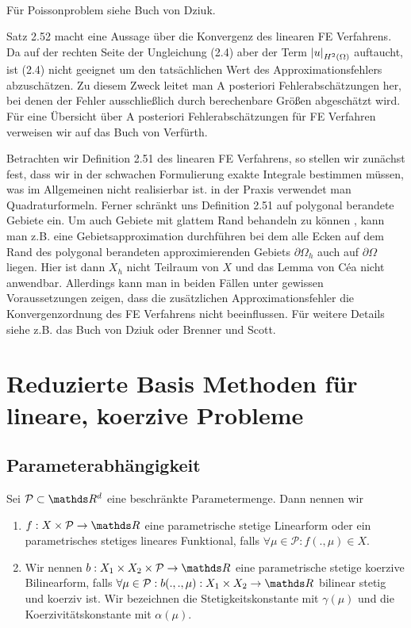 \\
Für Poissonproblem siehe Buch von Dziuk.

Satz 2.52 macht eine Aussage über die Konvergenz des linearen FE Verfahrens.
Da auf der rechten Seite der Ungleichung (2.4) aber der Term $\left\vert u\right\vert_{H^2(\Omega)}$ auftaucht, ist (2.4) nicht geeignet um den tatsächlichen Wert des Approximationsfehlers abzuschätzen.
Zu diesem Zweck leitet man A posteriori Fehlerabschätzungen her, bei denen der Fehler ausschließlich durch berechenbare Größen abgeschätzt wird.
Für eine Übersicht über A posteriori Fehlerabschätzungen für FE Verfahren verweisen wir auf das Buch von Verfürth.

Betrachten wir Definition 2.51 des linearen FE Verfahrens, so stellen wir zunächst fest, dass wir in der schwachen Formulierung exakte Integrale bestimmen müssen, was im Allgemeinen nicht realisierbar ist.
in der Praxis verwendet man Quadraturformeln.
Ferner schränkt uns Definition 2.51 auf polygonal berandete Gebiete ein.
Um auch Gebiete mit glattem Rand behandeln zu können , kann man z.B. eine Gebietsapproximation durchführen bei dem alle Ecken auf dem Rand des polygonal berandeten approximierenden Gebiets $\partial\Omega_h$ auch auf $\partial\Omega$ liegen.
Hier ist dann $X_h$ nicht Teilraum von $X$ und das Lemma von Céa nicht anwendbar.
Allerdings kann man in beiden Fällen unter gewissen Voraussetzungen zeigen, dass die zusätzlichen Approximationsfehler die Konvergenzordnung des FE Verfahrens nicht beeinflussen.
Für weitere Details siehe z.B. das Buch von Dziuk oder Brenner und Scott.
\newpage
\section{Reduzierte Basis Methoden für lineare, koerzive Probleme}

\subsection{Parameterabhängigkeit}

Sei $\mathcal{P}\subset \R^d$ eine beschränkte Parametermenge.
Dann nennen wir 
\begin{enumerate}[(1)]
	\item $f:X\times \mathcal{P}\to \R$ eine parametrische stetige Linearform oder ein parametrisches stetiges lineares Funktional, falls $\forall \mu\in\mathcal{P}: f(.,\mu)\in X$.
	\item Wir nennen $b:X_1\times X_2\times \mathcal{P}\to \R$ eine parametrische stetige koerzive Bilinearform, falls $\forall \mu\in \mathcal{P}: b(.,.,\mu):X_1\times X_2\to \R$ bilinear stetig und koerziv ist. Wir bezeichnen die Stetigkeitskonstante mit $\gamma(\mu)$ und die Koerzivitätskonstante mit $\alpha(\mu)$.
\end{enumerate}

